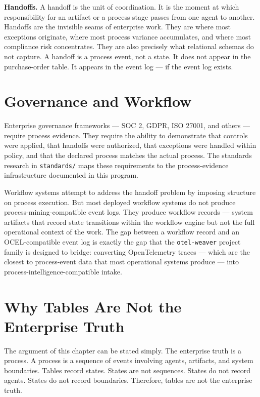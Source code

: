 \textbf{Handoffs.} A handoff is the unit of coordination. It is the moment at which responsibility for an artifact or a process stage passes from one agent to another. Handoffs are the invisible seams of enterprise work. They are where most exceptions originate, where most process variance accumulates, and where most compliance risk concentrates. They are also precisely what relational schemas do not capture. A handoff is a process event, not a state. It does not appear in the purchase-order table. It appears in the event log --- if the event log exists.

\section{Governance and Workflow}

Enterprise governance frameworks --- SOC 2, GDPR, ISO 27001, and others --- require process evidence. They require the ability to demonstrate that controls were applied, that handoffs were authorized, that exceptions were handled within policy, and that the declared process matches the actual process. The standards research in \texttt{standards/} maps these requirements to the process-evidence infrastructure documented in this program.

Workflow systems attempt to address the handoff problem by imposing structure on process execution. But most deployed workflow systems do not produce process-mining-compatible event logs. They produce workflow records --- system artifacts that record state transitions within the workflow engine but not the full operational context of the work. The gap between a workflow record and an OCEL-compatible event log is exactly the gap that the \texttt{otel-weaver} project family is designed to bridge: converting OpenTelemetry traces --- which are the closest to process-event data that most operational systems produce --- into process-intelligence-compatible intake.

\section{Why Tables Are Not the Enterprise Truth}

The argument of this chapter can be stated simply. The enterprise truth is a process. A process is a sequence of events involving agents, artifacts, and system boundaries. Tables record states. States are not sequences. States do not record agents. States do not record boundaries. Therefore, tables are not the enterprise truth.

